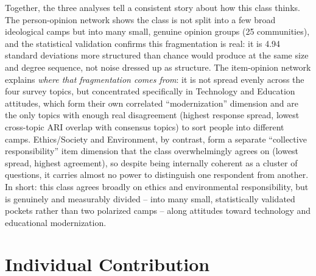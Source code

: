 \documentclass[11pt]{article}
\begin{document}
Together, the three analyses tell a consistent story about how this class thinks. The
person-opinion network shows the class is not split into a few broad ideological camps
but into many small, genuine opinion groups (25 communities), and the statistical
validation confirms this fragmentation is real: it is 4.94 standard deviations more
structured than chance would produce at the same size and degree sequence, not noise
dressed up as structure. The item-opinion network explains \emph{where that
fragmentation comes from}: it is not spread evenly across the four survey topics, but
concentrated specifically in Technology and Education attitudes, which form their own
correlated ``modernization'' dimension and are the only topics with enough real
disagreement (highest response spread, lowest cross-topic ARI overlap with consensus
topics) to sort people into different camps. Ethics/Society and Environment, by
contrast, form a separate ``collective responsibility'' item dimension that the class
overwhelmingly agrees on (lowest spread, highest agreement), so despite being
internally coherent as a cluster of questions, it carries almost no power to
distinguish one respondent from another. In short: this class agrees broadly on ethics
and environmental responsibility, but is genuinely and measurably divided -- into many
small, statistically validated pockets rather than two polarized camps -- along
attitudes toward technology and educational modernization.

\section{Individual Contribution}
\label{sec:contribution}
\end{document}
